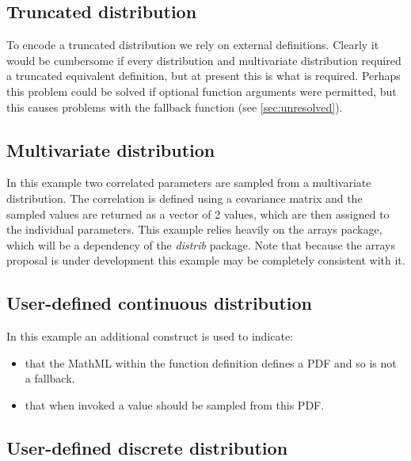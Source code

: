 \documentclass[draftspec]{sbmlpkgspec}
\newcommand{\arraysshort}{arrays\xspace}
\newcommand{\distribshort}{\emph{distrib}\xspace}
\newcommand{\mathml}{MathML\xspace}
\newcommand{\controversial}{\marginpar{\hspace*{34pt}\raisebox{-0.5ex}{\Large?}}}
\begin{document}

\subsection{Truncated distribution}
\label{sec: truncated-eg}

To encode a truncated distribution we rely on external
definitions. Clearly it would be cumbersome if every distribution and
multivariate distribution required a truncated equivalent definition,
but at present this is what is required\controversial. Perhaps this
problem could be solved if optional function arguments were permitted,
but this causes problems with the fallback function (see \ref{sec:unresolved}).


\subsection{Multivariate distribution}

In this example two correlated parameters are sampled from a
multivariate distribution. The correlation is defined using a
covariance matrix and the sampled values are returned as a vector of 2
values, which are then assigned to the individual parameters. This
example relies heavily on the \arraysshort package, which will be a
dependency of the \distribshort package. Note that because the
\arraysshort proposal is under development this example may be
completely consistent with it.


\subsection{User-defined continuous distribution }

In this example an additional construct is used to indicate:
\begin{itemize}
\item that the \mathml within the function definition defines a PDF and so is not a
fallback.
\item that when invoked a value should be sampled from this PDF.
\end{itemize}



\subsection{User-defined discrete distribution}
\label{sec:userDefinedDiscrete}
\end{document}
